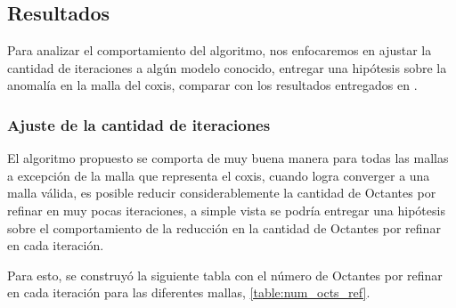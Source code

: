 \subsection{Resultados}

Para analizar el comportamiento del algoritmo, nos enfocaremos en ajustar la cantidad de iteraciones a algún modelo conocido, entregar una hipótesis sobre la anomalía en la malla del coxis, comparar con los resultados entregados en \cite{daines2018repairing}.

\subsubsection{Ajuste de la cantidad de iteraciones}

El algoritmo propuesto se comporta de muy buena manera para todas las mallas a excepción de la malla que representa el coxis, cuando logra converger a una malla válida, es posible reducir considerablemente la cantidad de Octantes por refinar en muy pocas iteraciones, a simple vista se podría entregar una hipótesis sobre el comportamiento de la reducción en la cantidad de Octantes por refinar en cada iteración.

Para esto, se construyó la siguiente tabla con el número de Octantes por refinar en cada iteración para las diferentes mallas, \autoref{table:num_octs_ref}.



